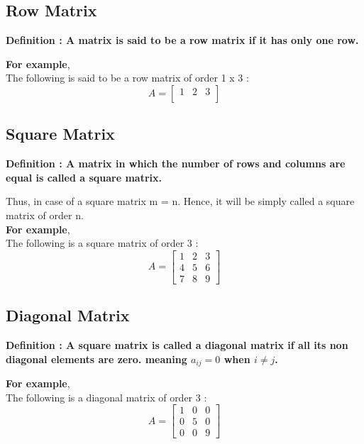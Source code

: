 \documentclass[12pt, letterpaper]{article}
\begin{document}
\subsection{Row Matrix}
\begin{displayquote}
\textbf{Definition : A matrix is said to be a row matrix if it has only one row.}
\end{displayquote}
\textbf{For example},\\
The following is said to be a row matrix of order 1 x 3 : 
\begin{displaymath}
A = \begin{bmatrix}
1 & 2 & 3\\
\end{bmatrix}
\end{displaymath}

\subsection{Square Matrix}
 \begin{displayquote}
\textbf{Definition : A matrix in which the number of rows and columns are equal is called a square matrix.}
\end{displayquote}
Thus, in case of a square matrix m = n. Hence, it will be simply called a square matrix of order n.\\
\textbf{For example},\\
The following is a square matrix of order 3 : 
 \begin{displaymath}
 A = \begin{bmatrix}
1 & 2 & 3 \\
4 & 5 & 6 \\
7 & 8 & 9
\end{bmatrix}
 \end{displaymath}

\subsection{Diagonal Matrix}
\begin{displayquote}
\textbf{Definition : A square matrix is called a diagonal matrix if all its non diagonal elements are zero. meaning $a_{ij} = 0$ when $i \neq j$.}
\end{displayquote}
\textbf{For example},\\
The following is a diagonal matrix of order 3 : 
\begin{displaymath}
A = \begin{bmatrix}
1 & 0 & 0 \\
0 & 5 & 0 \\
0 & 0 & 9
\end{bmatrix}
\end{displaymath}
\end{document}
